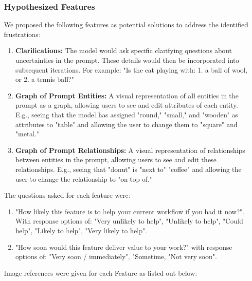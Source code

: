 \subsubsection{Hypothesized Features}
We proposed the following features as potential solutions to address the identified frustrations:
\begin{enumerate}
\item \textbf{Clarifications:} The model would ask specific clarifying questions about uncertainties in the prompt.  These details would then be incorporated into subsequent iterations. For example: "Is the cat playing with: 1. a ball of wool, or 2. a tennis ball?"
\item \textbf{Graph of Prompt Entities:}  A visual representation of all entities in the prompt as a graph, allowing users to see and edit attributes of each entity.  E.g., seeing that the model has assigned "round," "small," and "wooden" as attributes to "table" and allowing the user to change them to "square" and "metal."
\item \textbf{Graph of Prompt Relationships:} A visual representation of relationships between entities in the prompt, allowing users to see and edit these relationships. E.g., seeing that "donut" is "next to" "coffee" and allowing the user to change the relationship to "on top of."
\end{enumerate}

The questions asked for each feature were: 
\begin{enumerate}
\item "How likely this feature is to help your current workflow if you had it now?". With response options of: "Very unlikely to help", "Unlikely to help", "Could help", "Likely to help", "Very likely to help". 
\item "How soon would this feature deliver value to your work?" with response options of: "Very soon / immediately", "Sometime, "Not very soon".
\end{enumerate}

Image references were given for each Feature as listed out below:

